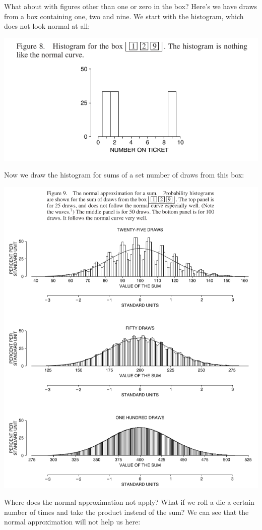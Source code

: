 \documentclass[
]{book}
\begin{document}
What about with figures other than one or zero in the box? Here's we have draws from a box containing one, two and nine. We start with the histogram, which does not look normal at all:

\includegraphics{images/Ch18Img06.png}

Now we draw the histogram for sums of a set number of draws from this box:

\includegraphics{images/Ch18Img07.png}

Where does the normal approximation not apply? What if we roll a die a certain number of times and take the product instead of the sum? We can see that the normal approximation will not help us here:
\end{document}
